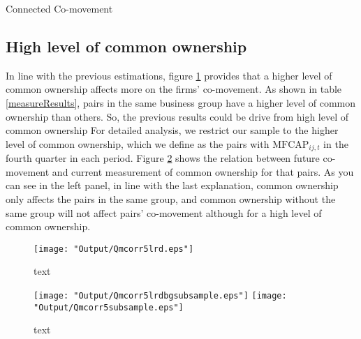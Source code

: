 {\begin{table}[p]
		\centering
		\caption{Connected Co-movement}
		\label{mresult2part2}
		\resizebox{1\textwidth}{!}{
			
				{}
			
		}
\end{table}}


		\FloatBarrier
		
		
		
		\subsection{{High level of common ownership}}
		
			In line with the previous estimations, figure \ref{Qmcorr5lrd} provides that a higher level of common ownership affects more on the firms' co-movement. As shown in table \ref{measureResults}, pairs in the same business group have a higher level of common ownership than others. So, the previous results could be drive from high level of common ownership For detailed analysis, we restrict our sample to the higher level of common ownership, which we define as the pairs with $\text{MFCAP}_{ij,t}$ in the fourth quarter in each period. Figure \ref{Qmcorr5subsample} shows the relation between future co-movement and current measurement of common ownership for that pairs. As you can see in the left panel, in line with the last explanation, common ownership only affects the pairs in the same group, and common ownership without the same group will not affect pairs' co-movement although for a high level of common ownership.
			
			\begin{figure}[htbp]
				\centering  
				\texttt{[image: "Output/Qmcorr5lrd.eps"]}
				\caption{text}
				\label{Qmcorr5lrd}
			\end{figure}
			\begin{figure}[htbp]
				\centering  
				\texttt{[image: "Output/Qmcorr5lrdbgsubsample.eps"]}
				\texttt{[image: "Output/Qmcorr5subsample.eps"]}
				\caption{text}
				\label{Qmcorr5subsample}
			\end{figure}
			
